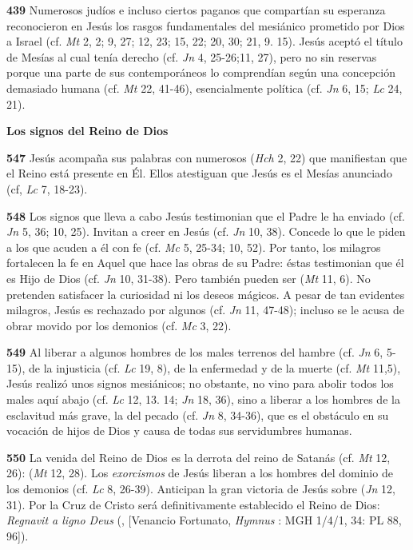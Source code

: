 \textbf{439} Numerosos judíos e incluso ciertos paganos que compartían su esperanza reconocieron en Jesús los rasgos fundamentales del mesiánico  prometido por Dios a Israel (cf. \emph{Mt} 2, 2; 9, 27; 12, 23; 15, 22; 20, 30; 21, 9. 15). Jesús aceptó el título de Mesías al cual tenía derecho (cf. \emph{Jn} 4, 25-26;11, 27), pero no sin reservas porque una parte de sus contemporáneos lo comprendían según una concepción demasiado humana (cf. \emph{Mt} 22, 41-46), esencialmente política (cf. \emph{Jn} 6, 15; \emph{Lc} 24, 21).

\textbf{Los signos del Reino de Dios}

\textbf{547} Jesús acompaña sus palabras con numerosos  (\emph{Hch} 2, 22) que manifiestan que el Reino está presente en Él. Ellos atestiguan que Jesús es el Mesías anunciado (cf, \emph{Lc} 7, 18-23).

\textbf{548} Los signos que lleva a cabo Jesús testimonian que el Padre le ha enviado (cf. \emph{Jn} 5, 36; 10, 25). Invitan a creer en Jesús (cf. \emph{Jn} 10, 38). Concede lo que le piden a los que acuden a él con fe (cf. \emph{Mc} 5, 25-34; 10, 52). Por tanto, los milagros fortalecen la fe en Aquel que hace las obras de su Padre: éstas testimonian que él es Hijo de Dios (cf. \emph{Jn} 10, 31-38). Pero también pueden ser  (\emph{Mt} 11, 6). No pretenden satisfacer la curiosidad ni los deseos mágicos. A pesar de tan evidentes milagros, Jesús es rechazado por algunos (cf. \emph{Jn} 11, 47-48); incluso se le acusa de obrar movido por los demonios (cf. \emph{Mc} 3, 22).

\textbf{549} Al liberar a algunos hombres de los males terrenos del hambre (cf. \emph{Jn} 6, 5-15), de la injusticia (cf. \emph{Lc} 19, 8), de la enfermedad y de la muerte (cf. \emph{Mt} 11,5), Jesús realizó unos signos mesiánicos; no obstante, no vino para abolir todos los males aquí abajo (cf. \emph{Lc} 12, 13. 14; \emph{Jn} 18, 36), sino a liberar a los hombres de la esclavitud más grave, la del pecado (cf. \emph{Jn} 8, 34-36), que es el obstáculo en su vocación de hijos de Dios y causa de todas sus servidumbres humanas.

\textbf{550} La venida del Reino de Dios es la derrota del reino de Satanás (cf. \emph{Mt} 12, 26):  (\emph{Mt} 12, 28). Los \emph{exorcismos} de Jesús liberan a los hombres del dominio de los demonios (cf. \emph{Lc} 8, 26-39). Anticipan la gran victoria de Jesús sobre  (\emph{Jn} 12, 31). Por la Cruz de Cristo será definitivamente establecido el Reino de Dios: \emph{Regnavit a ligno Deus} (, {[}Venancio Fortunato, \emph{Hymnus }: MGH 1/4/1, 34: PL 88, 96{]}).

